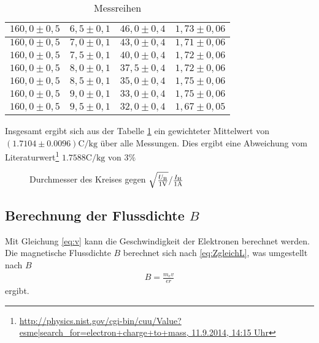 \documentclass[12pt,a4paper,titlepage,headinclude,bibtotoc]{scrartcl}
\numberwithin{equation}{section}
\begin{document}
\begin{table}[h!]
\begin{tabular}{|c|c|c|c|}
		 \hline                         
		 $160,0 \pm 0,5$ & $6,5 \pm 0,1$& $46,0 \pm 0,4$ & $1,73 \pm 0,06$\\
		 \hline                         
		 $160,0 \pm 0,5$ & $7,0 \pm 0,1$& $43,0 \pm 0,4$ & $1,71 \pm 0,06$\\
		 \hline                         
		 $160,0 \pm 0,5$ & $7,5 \pm 0,1$& $40,0 \pm 0,4$ & $1,72 \pm 0,06$\\
		 \hline                         
		 $160,0 \pm 0,5$ & $8,0 \pm 0,1$& $37,5 \pm 0,4$ & $1,72 \pm 0,06$\\
		 \hline                         
		 $160,0 \pm 0,5$ & $8,5 \pm 0,1$& $35,0 \pm 0,4$ & $1,75 \pm 0,06$\\
		 \hline                         
		 $160,0 \pm 0,5$ & $9,0 \pm 0,1$& $33,0 \pm 0,4$ & $1,75 \pm 0,06$\\
		 \hline                         
		 $160,0 \pm 0,5$ & $9,5 \pm 0,1$& $32,0 \pm 0,4$ & $1,67 \pm 0,05$\\
		  \hline
	  \end{tabular}
	  \caption{Messreihen}
	  \label{tbl:pythonmessung}
  \end{table}
Insgesamt ergibt sich aus der Tabelle \ref{tbl:pythonmessung} ein gewichteter Mittelwert von $(1.7104 \pm 0.0096)\si{\coulomb/\kilo\gram}$ über alle Messungen.
Dies ergibt eine Abweichung vom Literaturwert\footnote{\url{http://physics.nist.gov/cgi-bin/cuu/Value?esme|search_for=electron+charge+to+mass, 11.9.2014, 14:15 Uhr}} $1.7588\si{\coulomb/\kilo\gram}$ von $3\%$

\begin{figure}[!h]
	\centering
	
	\caption{Durchmesser des Kreises gegen $\sqrt{\frac{U_\text{B}}{1\text V}}/\frac{I_\text{H}}{1\text A}$}
	\label{fig:eric}
\end{figure}
\subsection{Berechnung der Flussdichte $B$}
Mit Gleichung \eqref{eq:v} kann die Geschwindigkeit der Elektronen berechnet werden.
Die magnetische Flussdichte $B$ berechnet sich nach \eqref{eq:ZgleichL}, was umgestellt nach $B$
\begin{align*}
B=\frac{m_ev}{er}
\end{align*}
ergibt.
\end{document}
